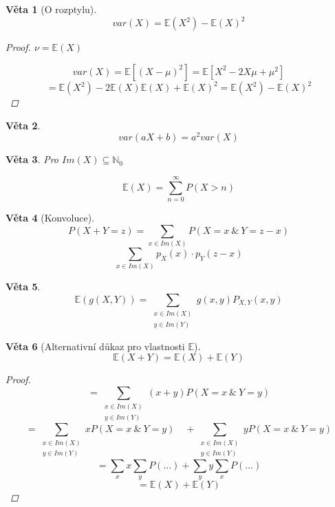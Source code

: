 \documentclass[10pt,a4paper]{article}
\theoremstyle{plain}
\newtheorem{veta}{Věta}
\theoremstyle{definition}
\begin{document}
\begin{veta}[O rozptylu]
\[var(X) = \mathbb{E}(X^2) - \mathbb{E}(X)^2 \]
\begin{proof}
$\nu = \mathbb{E}(X)$

\[ var(X) = \mathbb{E}\left[ (X-\mu)^2 \right] =\mathbb{E}\left[ X^2 - 2X\mu + \mu^2 \right] \]\[= \mathbb{E}(X^2) - 2\mathbb{E}(X)\mathbb{E}(X) + \mathbb{E}(X)^2 = \mathbb{E}(X^2) -\mathbb{E}(X)^2 \]
\end{proof}
\end{veta}

\begin{veta}
\[ var(aX + b) = a^2 var(X) \]
\end{veta}


\begin{veta}
Pro $Im(X) \subseteq \mathbb{N}_0$

\[\mathbb{E}(X)  = \sum^{\infty}_{n=0} P(X > n)\]
\end{veta}

\begin{veta}[Konvoluce]
\[ P(X + Y = z) = \sum_{x \in Im(X)} P(X = x \ \&\ Y=z-x)\]
\[ \sum_{x \in Im(X)} p_X(x) \cdot p_Y(z-x) \]
\end{veta}

\begin{veta}
\[\mathbb{E}(g(X,Y)) = \sum_{\begin{matrix}
x \in Im(X) \\ y \in Im(Y)
\end{matrix}} g(x,y) P_{X,Y}(x,y)\]
\end{veta}

\begin{veta}[Alternativní důkaz pro vlastnosti $\mathbb{E}$]
\[\mathbb{E}(X+Y) = \mathbb{E}(X) + \mathbb{E}(Y)\]
\begin{proof}
\[ = \sum_{\begin{matrix}
x \in Im(X) \\ y \in Im(Y)
\end{matrix}} (x+y)P(X = x \ \&\ Y=y) \]\[
= \sum_{\begin{matrix}
x \in Im(X) \\ y \in Im(Y)
\end{matrix}} xP(X = x \ \&\ Y=y) \quad + \sum_{\begin{matrix}
x \in Im(X) \\ y \in Im(Y)
\end{matrix}} yP(X = x \ \&\ Y=y)
\]\[
= \sum_x x \sum_y P(...) +  \sum_y y \sum_x P(...) \]\[
=  \mathbb{E}(X) + \mathbb{E}(Y)
\]
\end{proof}
\end{veta}
\end{document}
